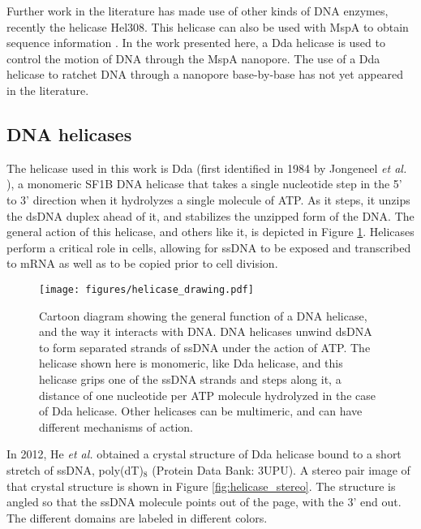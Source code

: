 Further work in the literature has made use of other kinds of DNA enzymes, recently the helicase Hel308.  This helicase can also be used with MspA to obtain sequence information \citep{Derrington2015}.  In the work presented here, a Dda helicase is used to control the motion of DNA through the MspA nanopore.  The use of a Dda helicase to ratchet DNA through a nanopore base-by-base has not yet appeared in the literature.

\subsection{DNA helicases}

The helicase used in this work is Dda (first identified in 1984 by Jongeneel \textit{et al.} \citep{Jongeneel1984}), a monomeric SF1B DNA helicase that takes a single nucleotide step in the 5' to 3' direction \citep{Raney1995} when it hydrolyzes a single molecule of ATP.  As it steps, it unzips the dsDNA duplex ahead of it, and stabilizes the unzipped form of the DNA.  The general action of this helicase, and others like it, is depicted in Figure \ref{fig:helicase_drawing}.  Helicases perform a critical role in cells, allowing for ssDNA to be exposed and transcribed to mRNA as well as to be copied prior to cell division.

\begin{figure}[h]
\begin{centering}
\texttt{[image: figures/helicase\_drawing.pdf]}
\caption[DNA helicase general function]{Cartoon diagram showing the general function of a DNA helicase, and the way it interacts with DNA.  DNA helicases unwind dsDNA to form separated strands of ssDNA under the action of ATP.  The helicase shown here is monomeric, like Dda helicase, and this helicase grips one of the ssDNA strands and steps along it, a distance of one nucleotide per ATP molecule hydrolyzed in the case of Dda helicase.  Other helicases can be multimeric, and can have different mechanisms of action.}
\label{fig:helicase_drawing}
\end{centering}
\end{figure}

In 2012, He \textit{et al.} \citep{He2012} obtained a crystal structure of Dda helicase bound to a short stretch of ssDNA, poly(dT)$_8$ (Protein Data Bank: 3UPU).  A stereo pair image of that crystal structure is shown in Figure \ref{fig:helicase_stereo}.  The structure is angled so that the ssDNA molecule points out of the page, with the 3' end out.  The different domains are labeled in different colors.

